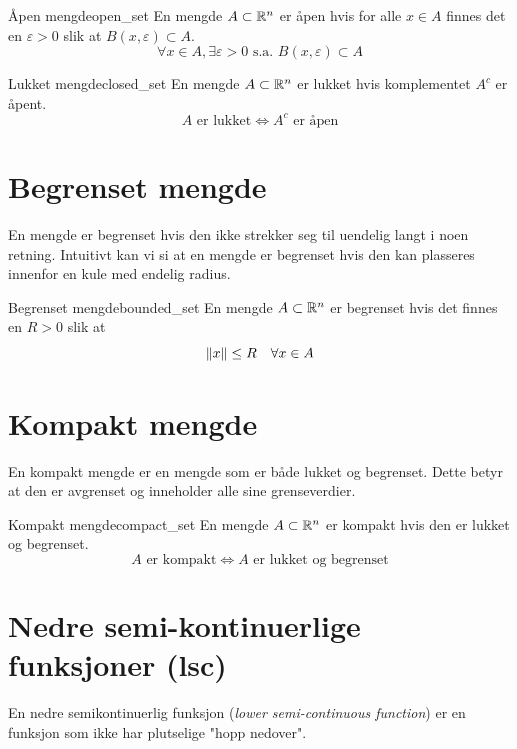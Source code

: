 \begin{definition}{Åpen mengde}{open_set}
  En mengde \(A \subset \mathbb{R}^n\) er åpen hvis for alle \(x \in A\) finnes det en \(\varepsilon > 0\) slik at \(B(x, \varepsilon) \subset A\).
  \[
    \forall x \in A, \exists \varepsilon > 0 \text{ s.a. } B(x, \varepsilon) \subset A
  \]
\end{definition}

\begin{definition}{Lukket mengde}{closed_set}
  En mengde \(A \subset \mathbb{R}^n\) er lukket hvis komplementet \(A^c\) er åpent.
  \[
    A \text{ er lukket} \Leftrightarrow A^c \text{ er åpen}
  \]
\end{definition}

\section{Begrenset mengde}
En mengde er begrenset hvis den ikke strekker seg til uendelig langt i noen retning.
Intuitivt kan vi si at en mengde er begrenset hvis den kan plasseres innenfor en kule med endelig radius.

\begin{definition}{Begrenset mengde}{bounded_set}
  En mengde \(A \subset \mathbb{R}^n\) er begrenset hvis det finnes en \(R > 0\) slik at
  \[
    \lVert x\rVert \leq R \quad \forall x \in A
  \]
\end{definition}

\section{Kompakt mengde}
En kompakt mengde er en mengde som er både lukket og begrenset. Dette betyr at den er avgrenset og inneholder alle sine grenseverdier.

\begin{definition}{Kompakt mengde}{compact_set}
  En mengde \(A \subset \mathbb{R}^n\) er kompakt hvis den er lukket og begrenset.
  \[
    A \text{ er kompakt} \Leftrightarrow A \text{ er lukket og begrenset}
  \]
\end{definition}

\section{Nedre semi-kontinuerlige funksjoner (lsc)}

En nedre semikontinuerlig funksjon (\textit{lower semi-continuous function}) er en funksjon som ikke har plutselige "hopp nedover".

